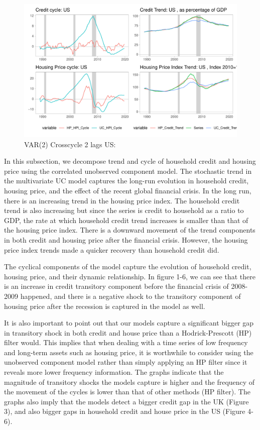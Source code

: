 \documentclass[12pt]{article}
\begin{document}
\begin{outline}[enumerate]
		\begin{figure}[h!]
			\caption{VAR(2) Crosscycle 2 lags US: }	
			\centerline{\includegraphics[scale=0.7]{../../Regression/VAR_2_crosscycle/Output/Graphs/HP_Credit_4graphs_US.pdf}}
		\end{figure}
		
		
		In this subsection, we decompose trend and cycle of household credit and housing price using the correlated unobserved component model. The stochastic trend in the multivariate UC model captures the long-run evolution in household credit, housing price, and the effect of the recent global financial crisis. In the long run, there is an increasing trend in the housing price index. The household credit trend is also increasing but since the series is credit to household as a ratio to GDP, the rate at which household credit trend increases is smaller than that of the housing price index. There is a downward movement of the trend components in both credit and housing price after the financial crisis. However, the housing price index trends made a quicker recovery than household credit did. 
		
		The cyclical components of the model capture the evolution of household credit, housing price, and their dynamic relationship. In figure 1-6, we can see that there is an increase in credit transitory component before the financial crisis of 2008-2009 happened, and there is a negative shock to the transitory component of housing price after the recession is captured in the model as well.
		
		It is also important to point out that our models capture a significant bigger gap in transitory shock in both credit and house price than a Hodrick-Prescott (HP) filter would. This implies that when dealing with a time series of low frequency and long-term assets such as housing price, it is worthwhile to consider using the unobserved component model rather than simply applying an HP filter since it reveals more lower frequency information. The graphs indicate that the magnitude of transitory shocks the models capture is higher and the frequency of the movement of the cycles is lower than that of other methods (HP filter). The graphs also imply that the models detect a bigger credit gap in the UK (Figure 3), and also bigger gaps in household credit and house price in the US (Figure 4-6).		
		

\end{outline}
\end{document}
